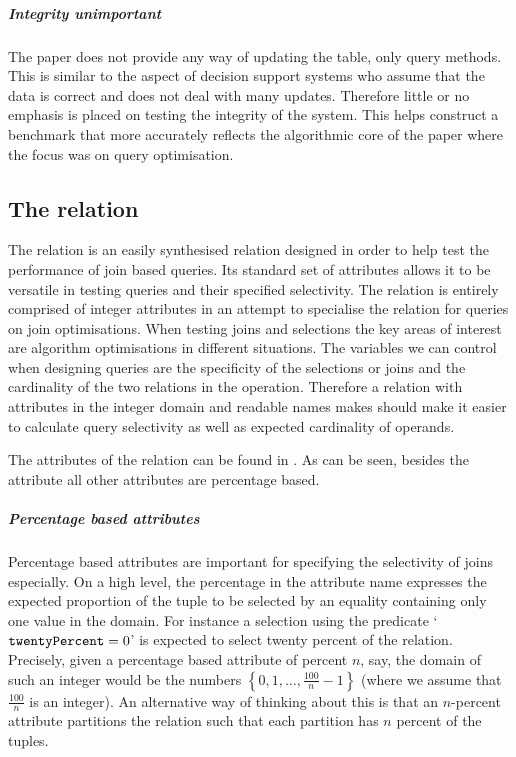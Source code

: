 \subparagraph{Integrity unimportant} The paper \relalg{} does not provide any way of
updating the table, only query methods. This is similar to the aspect of
decision support systems who assume that the data is correct and
does not deal with many updates. Therefore little or no emphasis is placed on
testing the integrity of the system. This helps construct a benchmark that more
accurately reflects the algorithmic core of the paper where the focus was on
query optimisation.

\subsection{The  relation}
The  relation is an easily synthesised relation designed in
order to help test the performance of join based queries. Its standard set of
attributes allows it to be versatile in testing queries and their specified selectivity.
The relation is entirely comprised of integer attributes in an
attempt to specialise the relation for queries on join optimisations. When
testing joins and selections the key areas of interest are algorithm
optimisations in different situations. The variables we can control when
designing queries are the specificity of the selections or joins and the cardinality
of the two relations in the operation. Therefore a relation with attributes in
the integer domain and readable names makes should make it easier to calculate
query selectivity as well as expected cardinality of operands.

The attributes of the  relation can be found in
. As can be seen, besides the
 attribute all other attributes are percentage based.

\subparagraph{Percentage based attributes} Percentage based attributes are
important for specifying the selectivity of joins especially. On a high level,
the percentage in the attribute name expresses the expected proportion of the
tuple to be selected by an equality containing only one value in the domain. For
instance a selection using the predicate `$\mathtt{twentyPercent} =
0$' is expected to select twenty percent of the relation. Precisely, given a
percentage based attribute of percent $n$, say, the domain of such an integer
would be the numbers $\left\{0, 1, \ldots, \frac{100}{n} - 1\right\}$ (where we
assume that $\frac{100}{n}$ is an integer). An alternative way of thinking about
this is that an $n$-percent attribute partitions the relation such that each
partition has $n$ percent of the tuples.

